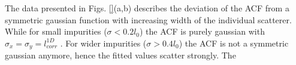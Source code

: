 The data presented in Figs. \ref{}(a,b) describes the deviation of the ACF from a symmetric gaussian function with increasing width of the individual scatterer. While for small impurities ($\sigma < 0.2 l_{0}$) the ACF is purely gaussian with $\sigma_{x}=\sigma_{y} =l_{corr}^{1D}$ . For wider impurities ($\sigma > 0.4 l_{0}$) the ACF is not a symmetric gaussian anymore, hence the fitted values scatter strongly. The 
